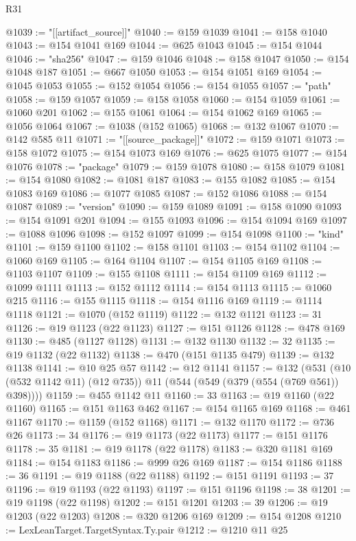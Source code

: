 \begin{lexlean}{R31}
\begin{coremodule}
@1039 := "[[artifact_source]]"
@1040 := @159 @1039
@1041 := @158 @1040
@1043 := @154 @1041 @169
@1044 := @625 @1043
@1045 := @154 @1044
@1046 := "sha256"
@1047 := @159 @1046
@1048 := @158 @1047
@1050 := @154 @1048 @187
@1051 := @667 @1050
@1053 := @154 @1051 @169
@1054 := @1045 @1053
@1055 := @152 @1054
@1056 := @154 @1055
@1057 := "path"
@1058 := @159 @1057
@1059 := @158 @1058
@1060 := @154 @1059
@1061 := @1060 @201
@1062 := @155 @1061
@1064 := @154 @1062 @169
@1065 := @1056 @1064
@1067 := @1038 (@152 @1065)
@1068 := @132 @1067
@1070 := @142 @585 @11
@1071 := "[[source_package]]"
@1072 := @159 @1071
@1073 := @158 @1072
@1075 := @154 @1073 @169
@1076 := @625 @1075
@1077 := @154 @1076
@1078 := "package"
@1079 := @159 @1078
@1080 := @158 @1079
@1081 := @154 @1080
@1082 := @1081 @187
@1083 := @155 @1082
@1085 := @154 @1083 @169
@1086 := @1077 @1085
@1087 := @152 @1086
@1088 := @154 @1087
@1089 := "version"
@1090 := @159 @1089
@1091 := @158 @1090
@1093 := @154 @1091 @201
@1094 := @155 @1093
@1096 := @154 @1094 @169
@1097 := @1088 @1096
@1098 := @152 @1097
@1099 := @154 @1098
@1100 := "kind"
@1101 := @159 @1100
@1102 := @158 @1101
@1103 := @154 @1102
@1104 := @1060 @169
@1105 := @164 @1104
@1107 := @154 @1105 @169
@1108 := @1103 @1107
@1109 := @155 @1108
@1111 := @154 @1109 @169
@1112 := @1099 @1111
@1113 := @152 @1112
@1114 := @154 @1113
@1115 := @1060 @215
@1116 := @155 @1115
@1118 := @154 @1116 @169
@1119 := @1114 @1118
@1121 := @1070 (@152 @1119)
@1122 := @132 @1121
@1123 := 31
@1126 := @19 @1123 (@22 @1123)
@1127 := @151 @1126
@1128 := @478 @169
@1130 := @485 (@1127 @1128)
@1131 := @132 @1130
@1132 := 32
@1135 := @19 @1132 (@22 @1132)
@1138 := @470 (@151 @1135 @479)
@1139 := @132 @1138
@1141 := @10 @25 @57
@1142 := @12 @1141
@1157 := @132
    (@531 (@10 (@532 @1142 @11) (@12 @735)) @11 (@544 (@549 (@379 (@554 (@769 @561)) @398))))
@1159 := @455 @1142 @11
@1160 := 33
@1163 := @19 @1160 (@22 @1160)
@1165 := @151 @1163 @462
@1167 := @154 @1165 @169
@1168 := @461 @1167
@1170 := @1159 (@152 @1168)
@1171 := @132 @1170
@1172 := @736 @26
@1173 := 34
@1176 := @19 @1173 (@22 @1173)
@1177 := @151 @1176
@1178 := 35
@1181 := @19 @1178 (@22 @1178)
@1183 := @320 @1181 @169
@1184 := @154 @1183
@1186 := @999 @26 @169
@1187 := @154 @1186
@1188 := 36
@1191 := @19 @1188 (@22 @1188)
@1192 := @151 @1191
@1193 := 37
@1196 := @19 @1193 (@22 @1193)
@1197 := @151 @1196
@1198 := 38
@1201 := @19 @1198 (@22 @1198)
@1202 := @151 @1201
@1203 := 39
@1206 := @19 @1203 (@22 @1203)
@1208 := @320 @1206 @169
@1209 := @154 @1208
@1210 := LexLeanTarget.TargetSyntax.Ty.pair
@1212 := @1210 @11 @25

\end{coremodule}
\end{lexlean}
